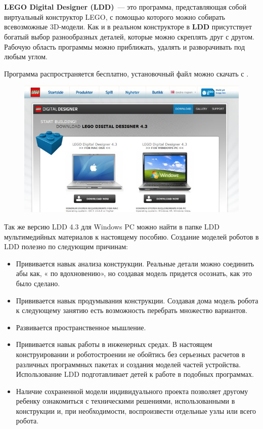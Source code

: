 {\hypertarget{lesson3x3}{}}\\\\

{\bfseries LEGO Digital Designer (LDD)}~--- это программа, представляющая собой виртуальный конструктор LEGO, с помощью которого можно собирать всевозможные 3D-модели. Как и в реальном конструкторе в {\bfseries LDD} присутствует богатый выбор разнообразных деталей, которые можно скреплять друг с другом. Рабочую область программы можно приближать, удалять и разворачивать под любым углом.

Программа распространяется бесплатно, установочный файл можно скачать с
\href{http://ldd.lego.com/nb-no/download/}{}.
\begin{figure}[h!]
	\begin{center}
		\includegraphics[width=1\linewidth]{chapters/chapter3/images/1}
		\caption{}
		\label{ris:image3x1}
	\end{center}
\end{figure}

Так же версию LDD 4.3 для Windows PC можно найти в папке LDD мультимедийных материалов к настоящему пособию.
\clearpage
Создание моделей  роботов в LDD полезно по следующим причинам:
\begin{itemize}
	\item Прививается навык анализа конструкции. Реальные детали можно соединить абы как, « по вдохновению», но создавая модель придется осознать, как это было сделано.
	\item Прививается навык продумывания конструкции. Создавая дома модель робота к следующему занятию есть возможность перебрать множество вариантов.
	\item Развивается пространственное мышление.
	\item Прививается навык работы в инженерных средах. В настоящем конструировании и роботостроении не обойтись без серьезных расчетов в различных программных пакетах и создания моделей частей устройства. Использование LDD подготавливает детей к работе в подобных программах.
	\item Наличие  сохраненной модели индивидуального проекта позволяет другому ребенку ознакомиться с техническими решениями, использованными в конструкции и, при необходимости, воспроизвести отдельные узлы или всего робота.
\end{itemize}


